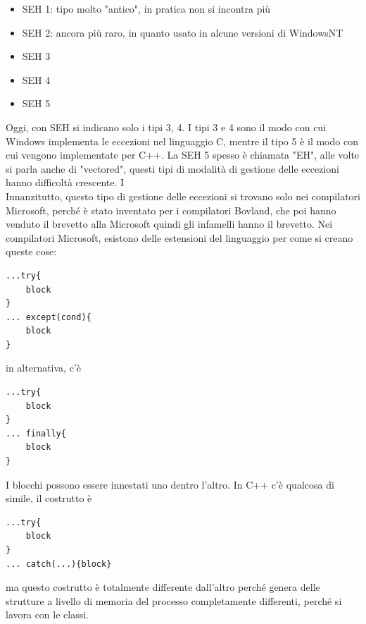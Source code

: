 \documentclass[12pt, oneside]{extbook}
\begin{document}
\begin{itemize}
\item SEH 1: tipo molto "antico", in pratica non si incontra più
\item SEH 2: ancora più raro, in quanto usato in alcune versioni di WindowsNT
\item SEH 3
\item SEH 4
\item SEH 5
\end{itemize}
Oggi, con SEH si indicano solo i tipi 3, 4. I tipi 3 e 4 sono il modo con cui Windows implementa le eccezioni nel linguaggio C, mentre il tipo 5 è il modo con cui vengono implementate per C++. La SEH 5 spesso è chiamata "EH", alle volte si parla anche di "vectored", questi tipi di modalità di gestione delle eccezioni hanno difficoltà crescente.
I\\Innanzitutto, questo tipo di gestione delle eccezioni si trovano solo nei compilatori Microsoft, perché è stato inventato per i compilatori Bovland, che poi hanno venduto il brevetto alla Microsoft quindi gli infamelli hanno il brevetto. Nei compilatori Microsoft, esistono delle estensioni del linguaggio per come si creano queste cose:
\begin{lstlisting}
...try{
	block
}
... except(cond){
	block
}
\end{lstlisting}
in alternativa, c'è 
\begin{lstlisting}
...try{
	block
}
... finally{
	block
}
\end{lstlisting}
I blocchi possono essere innestati uno dentro l'altro. In C++ c'è qualcosa di simile, il costrutto è 
\begin{lstlisting}
...try{
	block
}
... catch(...){block}
\end{lstlisting}
ma questo costrutto è totalmente differente dall'altro perché genera delle strutture a livello di memoria del processo completamente differenti, perché si lavora con le classi.\\
\end{document}
